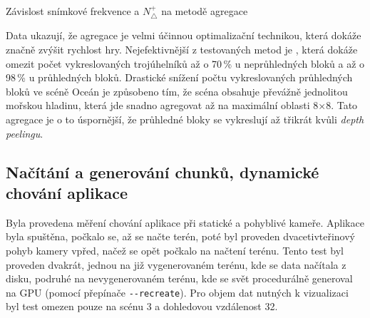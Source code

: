 \begin{tableFloat}[H]
	\caption{Závislost snímkové frekvence a $N_\triangle^+$ na metodě agregace}
\end{tableFloat}

Data ukazují, že agregace je velmi účinnou optimalizační technikou, která dokáže značně zvýšit rychlost hry. Nejefektivnější z testovaných metod je , která dokáže omezit počet vykreslovaných trojúhelníků až o 70\,\% u neprůhledných bloků a až o 98\,\% u průhledných bloků. Drastické snížení počtu vykreslovaných průhledných bloků ve scéně Oceán je způsobeno tím, že scéna obsahuje převážně jednolitou mořskou hladinu, která jde snadno agregovat až na maximální oblasti 8×8. Tato agregace je o to úspornější, že průhledné bloky se vykreslují až třikrát kvůli \textit{depth peelingu}.

\subsection{Načítání a generování chunků, dynamické chování aplikace}
Byla provedena měření chování aplikace při statické a pohyblivé kameře. Aplikace byla spuštěna, počkalo se, až se načte terén, poté byl proveden dvacetivteřinový pohyb kamery vpřed, načež se opět počkalo na načtení terénu. Tento test byl proveden dvakrát, jednou na již vygenerovaném terénu, kde se data načítala z disku, podruhé na nevygenerovaném terénu, kde se svět procedurálně generoval na GPU (pomocí přepínače \verb|--recreate|). Pro objem dat nutných k vizualizaci byl test omezen pouze na scénu 3 a dohledovou vzdálenost 32.

